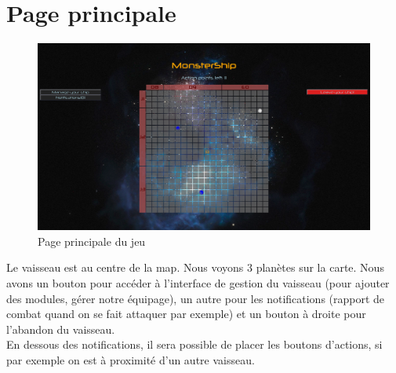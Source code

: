 \documentclass[a4paper,11pt]{report}
\begin{document}
    \section{Page principale}
        \begin{figure}[H]
            \begin{center}
                \includegraphics[width=\textwidth]{maquette/screens/main.png}
                \caption{Page principale du jeu}
                \label{fig:principale}
            \end{center}
        \end{figure}
        Le vaisseau est au centre de la map. Nous voyons 3 planètes sur la carte. Nous avons un bouton pour accéder à l'interface de gestion du vaisseau (pour ajouter des modules, gérer notre équipage), un autre pour les notifications (rapport de combat quand on se fait attaquer par exemple) et un bouton à droite pour l'abandon du vaisseau.\\

        En dessous des notifications, il sera possible de placer les boutons d'actions, si par exemple on est à proximité d'un autre vaisseau.
\end{document}
